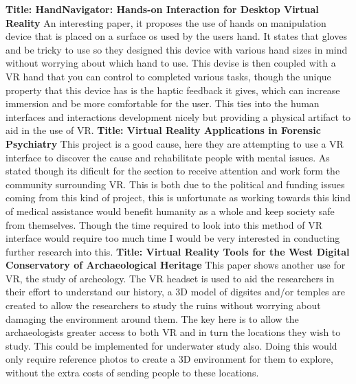\documentclass{scrartcl}
\begin{document}
		\newline
		\newline
		\newline
		\textbf{Title: HandNavigator: Hands-on Interaction for Desktop Virtual Reality}\cite{Kry}
		\newline
		An interesting paper, it proposes the use of hands on manipulation device that is placed on a surface os used by the users hand. It states that gloves and be tricky to use so they designed this device with various hand sizes in mind without worrying about which hand to use. This devise is then coupled with a VR hand that you can control to completed various tasks, though the unique property that this device has is the haptic feedback it gives, which can increase immersion and be more comfortable for the user. This ties into the human interfaces and interactions development nicely but providing a physical artifact to aid in the use of VR.
		\newline
		\newline
		\newline
		\textbf{Title: Virtual Reality Applications in Forensic Psychiatry}\cite{Benbouriche}
		\newline
		This project is a good cause, here they are attempting to use a VR interface to discover the cause and rehabilitate people with mental issues. As stated though its dificult for the section to receive attention and work form the community surrounding VR. This is both due to the political and funding issues coming from this kind of project, this is unfortunate as working towards this kind of medical assistance would benefit humanity as a whole and keep society safe from themselves. Though the time required to look into this method of VR interface would require too much time I would be very interested in conducting further research into this.
		\newline
		\newline
		\newline
		\textbf{Title: Virtual Reality Tools for the West Digital Conservatory of Archaeological Heritage}\cite{Barreau}
		\newline
		This paper shows another use for VR, the study of archeology. The VR headset is used to aid the researchers in their effort to understand our history, a 3D model of digsites and/or temples are created to allow the researchers to study the ruins without worrying about damaging the environment around them. The key here is to allow the archaeologists greater access to both VR and in turn the locations they wish to study. This could be implemented for underwater study also. Doing this would only require reference photos to create a 3D environment for them to explore, without the extra costs of sending people to these locations.

											
	
	
											
\end{document}
